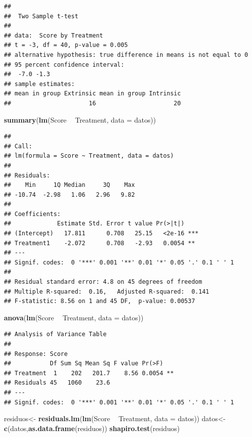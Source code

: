 \documentclass[]{book}
\newenvironment{Shaded}{\begin{snugshade}}{\end{snugshade}}
\newcommand{\KeywordTok}[1]{\textcolor[rgb]{0.13,0.29,0.53}{\textbf{#1}}}
\newcommand{\DataTypeTok}[1]{\textcolor[rgb]{0.13,0.29,0.53}{#1}}
\newcommand{\StringTok}[1]{\textcolor[rgb]{0.31,0.60,0.02}{#1}}
\newcommand{\OperatorTok}[1]{\textcolor[rgb]{0.81,0.36,0.00}{\textbf{#1}}}
\newcommand{\NormalTok}[1]{#1}
\begin{document}
\begin{verbatim}
## 
##  Two Sample t-test
## 
## data:  Score by Treatment
## t = -3, df = 40, p-value = 0.005
## alternative hypothesis: true difference in means is not equal to 0
## 95 percent confidence interval:
##  -7.0 -1.3
## sample estimates:
## mean in group Extrinsic mean in group Intrinsic 
##                      16                      20
\end{verbatim}

\begin{Shaded}
\begin{Highlighting}[]
\KeywordTok{summary}\NormalTok{(}\KeywordTok{lm}\NormalTok{(Score }\OperatorTok{~}\StringTok{ }\NormalTok{Treatment, }\DataTypeTok{data =}\NormalTok{ datos))}
\end{Highlighting}
\end{Shaded}

\begin{verbatim}
## 
## Call:
## lm(formula = Score ~ Treatment, data = datos)
## 
## Residuals:
##    Min     1Q Median     3Q    Max 
## -10.74  -2.98   1.06   2.96   9.82 
## 
## Coefficients:
##             Estimate Std. Error t value Pr(>|t|)    
## (Intercept)   17.811      0.708   25.15   <2e-16 ***
## Treatment1    -2.072      0.708   -2.93   0.0054 ** 
## ---
## Signif. codes:  0 '***' 0.001 '**' 0.01 '*' 0.05 '.' 0.1 ' ' 1
## 
## Residual standard error: 4.8 on 45 degrees of freedom
## Multiple R-squared:  0.16,   Adjusted R-squared:  0.141 
## F-statistic: 8.56 on 1 and 45 DF,  p-value: 0.00537
\end{verbatim}

\begin{Shaded}
\begin{Highlighting}[]
\KeywordTok{anova}\NormalTok{(}\KeywordTok{lm}\NormalTok{(Score }\OperatorTok{~}\StringTok{ }\NormalTok{Treatment, }\DataTypeTok{data =}\NormalTok{ datos))}
\end{Highlighting}
\end{Shaded}

\begin{verbatim}
## Analysis of Variance Table
## 
## Response: Score
##           Df Sum Sq Mean Sq F value Pr(>F)   
## Treatment  1    202   201.7    8.56 0.0054 **
## Residuals 45   1060    23.6                  
## ---
## Signif. codes:  0 '***' 0.001 '**' 0.01 '*' 0.05 '.' 0.1 ' ' 1
\end{verbatim}

\begin{Shaded}
\begin{Highlighting}[]
\NormalTok{residuos<-}\StringTok{ }\KeywordTok{residuals.lm}\NormalTok{(}\KeywordTok{lm}\NormalTok{(Score }\OperatorTok{~}\StringTok{ }\NormalTok{Treatment, }\DataTypeTok{data =}\NormalTok{ datos))}
\NormalTok{datos<-}\KeywordTok{c}\NormalTok{(datos,}\KeywordTok{as.data.frame}\NormalTok{(residuos))}
\KeywordTok{shapiro.test}\NormalTok{(residuos)}
\end{Highlighting}
\end{Shaded}
\end{document}
